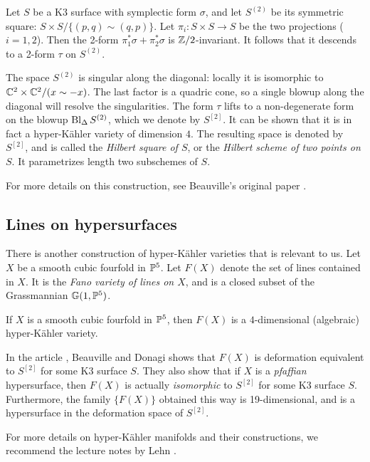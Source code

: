 Let $S$ be a K3 surface with symplectic form $\sigma$, and let $S^{(2)}$ be its symmetric square: $S \times S / \{ (p,q) \sim (q,p) \}$. Let $\pi_i:S \times S \to S$ be the two projections ($i=1,2$). Then the 2-form $\pi_1^\ast \sigma + \pi_2^\ast \sigma$ is $\Z/2$-invariant. It follows that it descends to a 2-form $\tau$ on $S^{(2)}$.

The space $S^{(2)}$ is singular along the diagonal: locally it is isomorphic to $\C^2 \times \C^2 /(x \sim -x)$. The last factor is a quadric cone, so a single blowup along the diagonal will resolve the singularities. The form $\tau$ lifts to a non-degenerate form on the blowup $\Bl_\Delta S^{(2)}$, which we denote by $S^{[2]}$. It can be shown that it is in fact a hyper-Kähler variety of dimension $4$. The resulting space is denoted by $S^{[2]}$, and is called the \emph{Hilbert square of $S$}, or the \emph{Hilbert scheme of two points on $S$}. It parametrizes length two subschemes of $S$.

For more details on this construction, see Beauville's original paper \cite{beauville_hyperkahler}.

\subsection{Lines on hypersurfaces}

There is another construction of hyper-Kähler varieties that is relevant to us. Let $X$ be a smooth cubic fourfold in $\P^5$. Let $F(X)$ denote the set of lines contained in $X$. It is the \emph{Fano variety of lines on $X$}, and is a closed subset of the Grassmannian $\mathbb G(1,\P^5)$.

\begin{proposition}
If $X$ is a smooth cubic fourfold in $\P^5$, then $F(X)$ is a $4$-dimensional (algebraic) hyper-Kähler variety.
\end{proposition}

In the article \cite{beauville_donagi_fano}, Beauville and Donagi shows that $F(X)$ is deformation equivalent to $S^{[2]}$ for some K3 surface $S$. They also show that if $X$ is a \emph{pfaffian} hypersurface, then $F(X)$ is actually \emph{isomorphic} to $S^{[2]}$ for some K3 surface $S$. Furthermore, the family $\{ F(X) \}$  obtained this way is 19-dimensional, and is a hypersurface in the deformation space of $S^{[2]}$.

For more details on hyper-Kähler manifolds and their constructions, we recommend the lecture notes by Lehn \cite{lehn_symplectic}.


